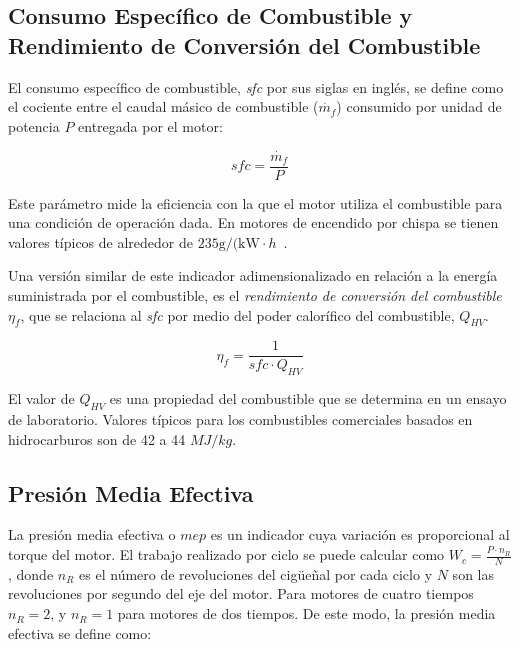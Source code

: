
\subsection{Consumo Específico de Combustible y Rendimiento de Conversión del
Combustible}
%
El consumo específico de combustible, \emph{sfc} por sus siglas en inglés, se
define como el cociente entre el caudal másico de combustible ($\dot{m_f}$)
consumido por unidad de potencia $P$ entregada por el motor:

\begin{equation}\label{eq:sfc} sfc = \frac{\dot{m_f}}{P}
\end{equation}

Este parámetro mide la eficiencia con la que el motor utiliza el combustible
para una condición de operación dada.
%
En motores de encendido por chispa se tienen valores típicos de alrededor de
$235\text{g/(kW}\cdot h$~\parencite{heywood}.

Una versión similar de este indicador adimensionalizado en relación a la energía
suministrada por el combustible, es el \emph{rendimiento de conversión del
combustible} $\eta_f$, que se relaciona al \emph{sfc} por medio del poder
calorífico del combustible, $Q_{HV}$.


\begin{equation}\label{eq:eta_f} \eta_f = \frac{1}{sfc \cdot Q_{HV}}
\end{equation}

El valor de $Q_{HV}$ es una propiedad del combustible que se determina en un
ensayo de laboratorio.
%
Valores típicos para los combustibles comerciales basados en hidrocarburos son
de 42 a 44 $MJ/kg$.


\subsection{Presión Media Efectiva}
%
La presión media efectiva o $mep$ es un indicador cuya variación es proporcional
al torque del motor.
%
El trabajo realizado por ciclo se puede calcular como
$W_c = \frac{P \cdot n_R}{N}$, donde $n_R$ es el número de revoluciones del
cigüeñal por cada ciclo y $N$ son las revoluciones por segundo del eje del motor.
%
Para motores de cuatro tiempos $n_R=2$, y $n_R=1$ para motores de dos tiempos.
%
De este modo, la presión media efectiva se define como:

